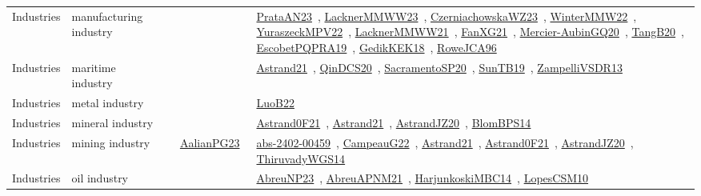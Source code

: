 {\begin{longtable}{lp{3cm}>{\raggedright\arraybackslash}p{6cm}>{\raggedright\arraybackslash}p{6cm}>{\raggedright\arraybackslash}p{8cm}}
\index{manufacturing industry}\index{Industries!manufacturing industry}Industries & manufacturing industry &  &  & \href{../works/PrataAN23.pdf}{PrataAN23}~\cite{PrataAN23}, \href{../works/LacknerMMWW23.pdf}{LacknerMMWW23}~\cite{LacknerMMWW23}, \href{../works/CzerniachowskaWZ23.pdf}{CzerniachowskaWZ23}~\cite{CzerniachowskaWZ23}, \href{../works/WinterMMW22.pdf}{WinterMMW22}~\cite{WinterMMW22}, \href{../works/YuraszeckMPV22.pdf}{YuraszeckMPV22}~\cite{YuraszeckMPV22}, \href{../works/LacknerMMWW21.pdf}{LacknerMMWW21}~\cite{LacknerMMWW21}, \href{../works/FanXG21.pdf}{FanXG21}~\cite{FanXG21}, \href{../works/Mercier-AubinGQ20.pdf}{Mercier-AubinGQ20}~\cite{Mercier-AubinGQ20}, \href{../works/TangB20.pdf}{TangB20}~\cite{TangB20}, \href{../works/EscobetPQPRA19.pdf}{EscobetPQPRA19}~\cite{EscobetPQPRA19}, \href{../works/GedikKEK18.pdf}{GedikKEK18}~\cite{GedikKEK18}, \href{../works/RoweJCA96.pdf}{RoweJCA96}~\cite{RoweJCA96}\\
\index{maritime industry}\index{Industries!maritime industry}Industries & maritime industry &  &  & \href{../works/Astrand21.pdf}{Astrand21}~\cite{Astrand21}, \href{../works/QinDCS20.pdf}{QinDCS20}~\cite{QinDCS20}, \href{../works/SacramentoSP20.pdf}{SacramentoSP20}~\cite{SacramentoSP20}, \href{../works/SunTB19.pdf}{SunTB19}~\cite{SunTB19}, \href{../works/ZampelliVSDR13.pdf}{ZampelliVSDR13}~\cite{ZampelliVSDR13}\\
\index{metal industry}\index{Industries!metal industry}Industries & metal industry &  &  & \href{../works/LuoB22.pdf}{LuoB22}~\cite{LuoB22}\\
\index{mineral industry}\index{Industries!mineral industry}Industries & mineral industry &  &  & \href{../works/Astrand0F21.pdf}{Astrand0F21}~\cite{Astrand0F21}, \href{../works/Astrand21.pdf}{Astrand21}~\cite{Astrand21}, \href{../works/AstrandJZ20.pdf}{AstrandJZ20}~\cite{AstrandJZ20}, \href{../works/BlomBPS14.pdf}{BlomBPS14}~\cite{BlomBPS14}\\
\index{mining industry}\index{Industries!mining industry}Industries & mining industry &  & \href{../works/AalianPG23.pdf}{AalianPG23}~\cite{AalianPG23} & \href{../works/abs-2402-00459.pdf}{abs-2402-00459}~\cite{abs-2402-00459}, \href{../works/CampeauG22.pdf}{CampeauG22}~\cite{CampeauG22}, \href{../works/Astrand21.pdf}{Astrand21}~\cite{Astrand21}, \href{../works/Astrand0F21.pdf}{Astrand0F21}~\cite{Astrand0F21}, \href{../works/AstrandJZ20.pdf}{AstrandJZ20}~\cite{AstrandJZ20}, \href{../works/ThiruvadyWGS14.pdf}{ThiruvadyWGS14}~\cite{ThiruvadyWGS14}\\
\index{oil industry}\index{Industries!oil industry}Industries & oil industry &  &  & \href{../works/AbreuNP23.pdf}{AbreuNP23}~\cite{AbreuNP23}, \href{../works/AbreuAPNM21.pdf}{AbreuAPNM21}~\cite{AbreuAPNM21}, \href{../works/HarjunkoskiMBC14.pdf}{HarjunkoskiMBC14}~\cite{HarjunkoskiMBC14}, \href{../works/LopesCSM10.pdf}{LopesCSM10}~\cite{LopesCSM10}\\

\end{longtable}}
